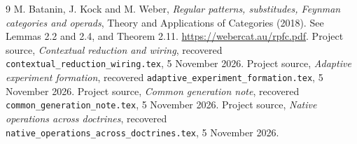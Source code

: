 \documentclass[11pt]{article}
\theoremstyle{definition}\newtheorem{definition}[theorem]{Definition}
\theoremstyle{remark}\newtheorem{remark}[theorem]{Remark}
\begin{document}
\begin{thebibliography}{9}
 M. Batanin, J. Kock and M. Weber,
\emph{Regular patterns, substitudes, Feynman categories and operads},
Theory and Applications of Categories (2018).
See Lemmas 2.2 and 2.4, and Theorem 2.11.
\url{https://webercat.au/rpfc.pdf}.
 Project source,
\emph{Contextual reduction and wiring}, recovered
\texttt{contextual\_reduction\_wiring.tex}, 5 November 2026.
 Project source,
\emph{Adaptive experiment formation}, recovered
\texttt{adaptive\_experiment\_formation.tex}, 5 November 2026.
 Project source,
\emph{Common generation note}, recovered
\texttt{common\_generation\_note.tex}, 5 November 2026.
 Project source,
\emph{Native operations across doctrines}, recovered
\texttt{native\_operations\_across\_doctrines.tex}, 5 November 2026.
\end{thebibliography}
\end{document}
